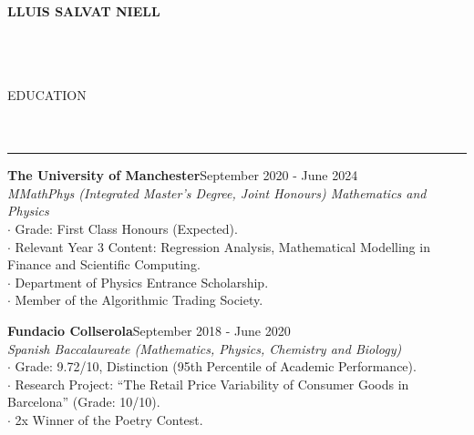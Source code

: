 \documentclass[11pt]{article}
\begin{document}
\setlength{\parindent}{0pt}

\hfill{\textbf{\LARGE LLUIS SALVAT NIELL}}\hfill\hfill\\

\vspace{-0.4em}\\

\address{
    \hfill\hfill\hfill\hfill
    \href{mailto:lluissalvatniell@gmail.com}{ lluissalvatniell@gmail.com}
    \hfill
    \href{tel: +34 684 021 805}{ +34 684 021 805}
    \hfill
    \href{https://www.linkedin.com/in/lluissalvatniell/}{ LinkedIn}
    \hfill
    \href{https://github.com/lluissalvat}{ GitHub (Personal Projects)}
    \hfill\hfill\hfill\hfill}\\

\vspace{-0.4em}\\

{\large EDUCATION}\\
\vspace{-1.5em}\\
\vspace{-1.5em}\\
\noindent\rule{\textwidth}{0.1pt}

\hspace{}

\vspace{-0.7em}

\textbf{The University of Manchester}\hspace*{\fill}September 2020 - June 2024\\
\emph{MMathPhys (Integrated Master’s Degree, Joint Honours) Mathematics and Physics}\smallskip\\
$\cdot$ Grade: First Class Honours (Expected).\\
$\cdot$ Relevant Year 3 Content: Regression Analysis, Mathematical Modelling in Finance and Scientific Computing.\\
$\cdot$ Department of Physics Entrance Scholarship.\\
$\cdot$ Member of the Algorithmic Trading Society.\\

\vspace{-0.6em}

\textbf{Fundacio Collserola}\hspace*{\fill}September 2018 - June 2020\\
\emph{Spanish Baccalaureate (Mathematics, Physics, Chemistry and Biology)}\smallskip\\
$\cdot$ Grade: 9.72/10, Distinction (95th Percentile of Academic Performance).\\
$\cdot$ Research Project: “The Retail Price Variability of Consumer Goods in Barcelona” (Grade: 10/10).\\
$\cdot$ 2x Winner of the Poetry Contest.\\
\end{document}
